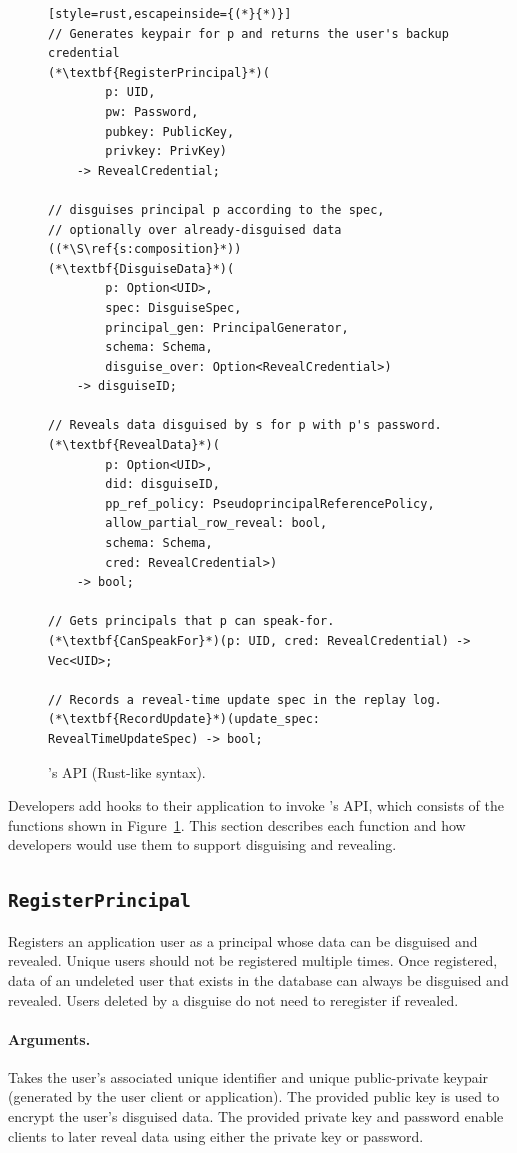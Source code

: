 \begin{figure}[t]
\begin{lstlisting}[style=rust,escapeinside={(*}{*)}]
// Generates keypair for p and returns the user's backup credential
(*\textbf{RegisterPrincipal}*)(
        p: UID, 
        pw: Password,
        pubkey: PublicKey, 
        privkey: PrivKey)
    -> RevealCredential;

// disguises principal p according to the spec, 
// optionally over already-disguised data ((*\S\ref{s:composition}*))
(*\textbf{DisguiseData}*)(
        p: Option<UID>, 
        spec: DisguiseSpec,
        principal_gen: PrincipalGenerator,
        schema: Schema,
        disguise_over: Option<RevealCredential>) 
    -> disguiseID;

// Reveals data disguised by s for p with p's password. 
(*\textbf{RevealData}*)(
        p: Option<UID>, 
        did: disguiseID, 
        pp_ref_policy: PseudoprincipalReferencePolicy,
        allow_partial_row_reveal: bool,
        schema: Schema,
        cred: RevealCredential>)
    -> bool;

// Gets principals that p can speak-for.
(*\textbf{CanSpeakFor}*)(p: UID, cred: RevealCredential) -> Vec<UID>;

// Records a reveal-time update spec in the replay log.
(*\textbf{RecordUpdate}*)(update_spec: RevealTimeUpdateSpec) -> bool;
\end{lstlisting}
\caption{\sys's API (Rust-like syntax).}
\label{f:api-high}
\end{figure}
%

Developers add hooks to their application to invoke \sys's API, which consists
of the functions shown in Figure~\ref{f:api-high}. This section describes each
function and how developers would use them to support disguising and revealing.
    

\subsection{\texttt{RegisterPrincipal}}

    Registers an application user as a principal whose data can be disguised and
    revealed. Unique users should not be registered multiple times.  Once
    registered, data of an undeleted user that exists in the database can always
    be disguised and revealed.
    Users deleted by a disguise do not need to reregister if revealed.

    \paragraph{Arguments.} Takes the user's associated unique identifier and unique
    public-private keypair (generated by the user
    client or application).
    The provided public key is used to encrypt the user's disguised data. The
    provided private key and password enable clients to later reveal data using
    either the private key or password.

